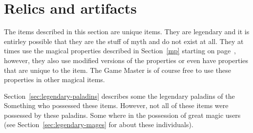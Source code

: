 \section{Relics and artifacts}
The items described in this section are unique items.
They are legendary and it is entirley possible that they are the stuff of myth
and do not exist at all.
They at times use the magical properties described in Section~\ref{mp} starting on
page~\pageref{mp}, however, they also use modified versions of the properties or even
have properties that are unique to the item.
The Game Master is of course free to use these properties in other magical items.

Section~\vref{sec:legendary-paladins} describes some the legendary paladins of
the Something who possessed these items.
However,
not all of these items were possessed by these paladins.
Some where in the possession of great magic users
(see Section~\vref{sec:legendary-mages} for about these individuals).
